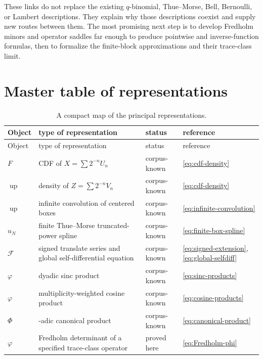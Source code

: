 \documentclass[11pt,oneside]{article}
\theoremstyle{definition}
\newcommand{\Up}{\operatorname{up}}
\newcommand{\PhiF}{\Phi}
\newcommand{\phiF}{\varphi}
\begin{document}
These links do not replace the existing \(q\)-binomial, Thue--Morse, Bell, Bernoulli,
or Lambert descriptions.  They explain why those descriptions coexist and supply new
routes between them.  The most promising next step is to develop Fredholm minors and
operator saddles far enough to produce pointwise and inverse-function formulas, then
to formalize the finite-block approximations and their trace-class limit.

\appendix

\section{Master table of representations}
\label{app:atlas}

\small
\begin{longtable}{>{\raggedright\arraybackslash}p{}
                  >{\raggedright\arraybackslash}p{}
                  >{\raggedright\arraybackslash}p{}
                  >{\raggedright\arraybackslash}p{}}
\caption{A compact map of the principal representations.}\label{tab:master-atlas}\\
\toprule
Object&type of representation&status&reference\\
\midrule
\endfirsthead
\toprule
Object&type of representation&status&reference\\
\midrule
\endhead
\bottomrule
\endfoot
\(F\)&CDF of \(X=\sum2^{-n}U_n\)&corpus-known&\eqref{eq:cdf-density}\\
\(\Up\)&density of \(Z=\sum2^{-n}V_n\)&corpus-known&\eqref{eq:cdf-density}\\
\(\Up\)&infinite convolution of centered boxes&corpus-known&\eqref{eq:infinite-convolution}\\
\(u_N\)&finite Thue--Morse truncated-power spline&corpus-known&\eqref{eq:finite-box-spline}\\
\(\mathcal F\)&signed translate series and global self-differential equation&corpus-known&\eqref{eq:signed-extension}, \eqref{eq:global-selfdiff}\\
\(\phiF\)&dyadic sinc product&corpus-known&\eqref{eq:sinc-products}\\
\(\phiF\)&multiplicity-weighted cosine product&corpus-known&\eqref{eq:cosine-products}\\
\(\PhiF\)&2-adic canonical product&corpus-known&\eqref{eq:canonical-product}\\
\(\phiF\)&Fredholm determinant of a specified trace-class operator&proved here&\eqref{eq:Fredholm-phi}\\

\end{longtable}
\end{document}
